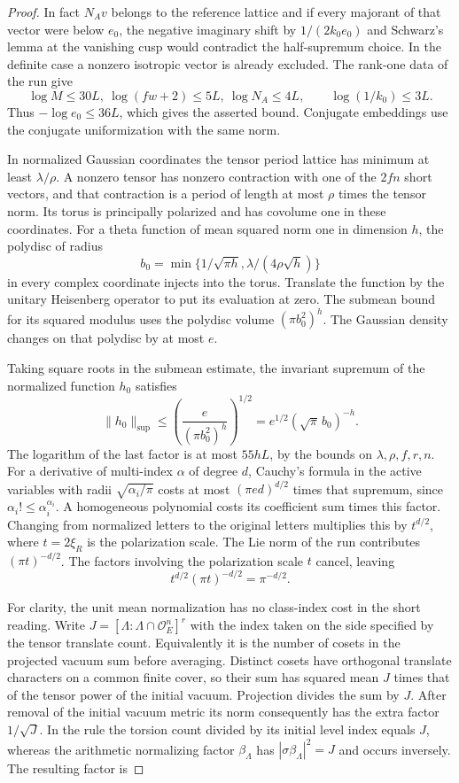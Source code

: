 \begin{proof}
In fact \(N_A v\) belongs to the reference lattice and if every
majorant of that vector were below \(e_0\), the negative imaginary
shift by \(1/(2k_0e_0)\) and Schwarz's lemma at the vanishing cusp
would contradict the half-supremum choice. In the definite case a
nonzero isotropic vector is already excluded. The rank-one data of
the run give \[
 \log M\le30L,\ \log(fw+2)\le5L,\ \log N_A\le4L,\qquad \log(1/k_0)\le3L.
\] Thus \(-\log e_0\le36L\), which gives
the asserted bound. Conjugate embeddings use the conjugate
uniformization with the same norm.
\label{cor:slice-short-heights-3}

In normalized Gaussian coordinates the tensor period lattice has
minimum at least \(\lambda/\rho\). A nonzero tensor has nonzero
contraction with one of the \(2fn\) short vectors, and that contraction
is a period of length at most \(\rho\) times the tensor norm. Its
torus is principally polarized and has covolume one in these
coordinates. For a theta function of mean squared norm one in
dimension \(h\), the polydisc of radius
\[
 b_0=\min\{1/\sqrt{\pi h},\lambda/(4\rho\sqrt h)\}
\]
in every complex coordinate injects into the torus. Translate the
function by the unitary Heisenberg operator to put its evaluation
at zero. The submean bound for its squared modulus uses the
polydisc volume \((\pi b_0^2)^h\). The Gaussian density changes
on that polydisc by at most \(e\).

Taking square roots in the submean estimate, the invariant supremum of the normalized function \(h_0\) satisfies
\[
  \|h_0\|_{\sup}\le\left(\frac{e}{(\pi b_0^2)^h}\right)^{1/2}=e^{1/2}(\sqrt\pi\,b_0)^{-h}.
\]
The logarithm of the last factor is at most \(55hL\), by the
bounds on \(\lambda,\rho,f,r,n\). For a derivative of multi-index
\(\alpha\) of degree \(d\), Cauchy's formula in the active variables
with radii \(\sqrt{\alpha_i/\pi}\) costs at most
\((\pi e d)^{d/2}\) times that supremum, since
\(\alpha_i!\le\alpha_i^{\alpha_i}\). A homogeneous polynomial costs
its coefficient sum times this factor. Changing from normalized
letters to the original letters multiplies this by \(t^{d/2}\),
where \(t=2\xi_R\) is the polarization scale. The Lie norm of the
run contributes \((\pi t)^{-d/2}\).
The factors involving the polarization scale \(t\) cancel, leaving
\[
  t^{d/2}(\pi t)^{-d/2}=\pi^{-d/2}.
\]

For clarity, the unit mean normalization has no class-index cost in
the short reading. Write \(J=[\Lambda:\Lambda\cap\mathcal O_E^n]^r\)
with the index taken on the side specified by the tensor translate
count. Equivalently it is the number of cosets in the projected
vacuum sum before averaging. Distinct cosets have orthogonal
translate characters on a common finite cover, so their sum has
squared mean \(J\) times that of the tensor power of the initial
vacuum. Projection divides the sum by \(J\). After removal of the
initial vacuum metric its norm consequently has the extra factor
\(1/\sqrt J\). In the rule the torsion count divided by its initial
level index equals \(J\), whereas the arithmetic normalizing
factor \(\beta_\Lambda\) has \(|\sigma\beta_\Lambda|^2=J\) and
occurs inversely. The resulting factor is


\end{proof}

